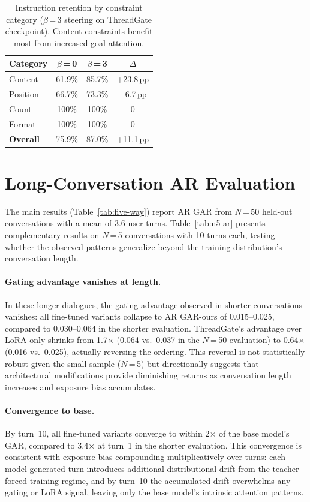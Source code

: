 \begin{table}[t]
\centering\small
\caption{Instruction retention by constraint category ($\beta$\,=\,3 steering on ThreadGate checkpoint). Content constraints benefit most from increased goal attention.}
\label{tab:ir-results}
\begin{tabular}{lccc}
\toprule
\textbf{Category} & $\beta$\,=\,0 & $\beta$\,=\,3 & $\Delta$ \\
\midrule
Content    & 61.9\% & 85.7\% & +23.8\,pp \\
Position   & 66.7\% & 73.3\% & +6.7\,pp \\
Count      & 100\%  & 100\%  & 0 \\
Format     & 100\%  & 100\%  & 0 \\
\midrule
\textbf{Overall} & 75.9\% & 87.0\% & +11.1\,pp \\
\bottomrule
\end{tabular}
\end{table}

\section{Long-Conversation AR Evaluation}\label{sec:appendix-n5}

The main results (Table~\ref{tab:five-way}) report AR GAR from $N$\,=\,50 held-out conversations with a mean of 3.6 user turns. Table~\ref{tab:n5-ar} presents complementary results on $N$\,=\,5 conversations with 10 turns each, testing whether the observed patterns generalize beyond the training distribution's conversation length.

\paragraph{Gating advantage vanishes at length.} In these longer dialogues, the gating advantage observed in shorter conversations vanishes: all fine-tuned variants collapse to AR GAR-ours of 0.015--0.025, compared to 0.030--0.064 in the shorter evaluation. ThreadGate's advantage over LoRA-only shrinks from 1.7$\times$ (0.064 vs.\ 0.037 in the $N$\,=\,50 evaluation) to 0.64$\times$ (0.016 vs.\ 0.025), actually reversing the ordering. This reversal is not statistically robust given the small sample ($N$\,=\,5) but directionally suggests that architectural modifications provide diminishing returns as conversation length increases and exposure bias accumulates.

\paragraph{Convergence to base.} By turn~10, all fine-tuned variants converge to within 2$\times$ of the base model's GAR, compared to 3.4$\times$ at turn~1 in the shorter evaluation. This convergence is consistent with exposure bias compounding multiplicatively over turns: each model-generated turn introduces additional distributional drift from the teacher-forced training regime, and by turn~10 the accumulated drift overwhelms any gating or LoRA signal, leaving only the base model's intrinsic attention patterns.

